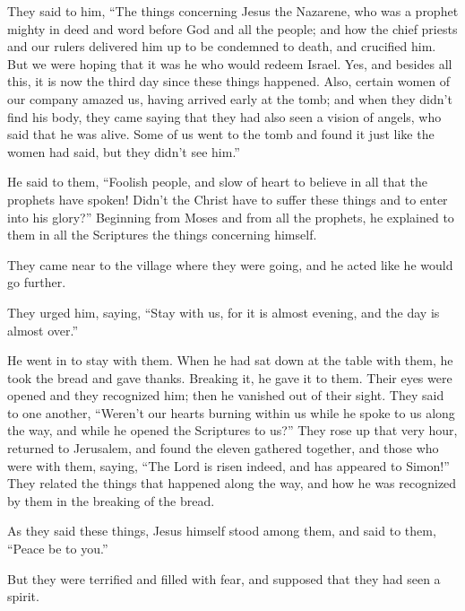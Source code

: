 They said to him, ``The things concerning Jesus the Nazarene, who was a
prophet mighty in deed and word before God and all the people;
 and how the chief priests and our rulers delivered him
up to be condemned to death, and crucified him.  But we
were hoping that it was he who would redeem Israel. Yes, and besides all
this, it is now the third day since these things happened.
 Also, certain women of our company amazed us, having
arrived early at the tomb;  and when they didn't find his
body, they came saying that they had also seen a vision of angels, who
said that he was alive.  Some of us went to the tomb and
found it just like the women had said, but they didn't see him.''

 He said to them, ``Foolish people, and slow of heart to
believe in all that the prophets have spoken!  Didn't the
Christ have to suffer these things and to enter into his glory?''
 Beginning from Moses and from all the prophets, he
explained to them in all the Scriptures the things concerning himself.

 They came near to the village where they were going, and
he acted like he would go further.

 They urged him, saying, ``Stay with us, for it is almost
evening, and the day is almost over.''

He went in to stay with them.  When he had sat down at
the table with them, he took the bread and gave thanks. Breaking it, he
gave it to them.  Their eyes were opened and they
recognized him; then he vanished out of their sight. 
They said to one another, ``Weren't our hearts burning within us while
he spoke to us along the way, and while he opened the Scriptures to
us?''  They rose up that very hour, returned to
Jerusalem, and found the eleven gathered together, and those who were
with them,  saying, ``The Lord is risen indeed, and has
appeared to Simon!''  They related the things that
happened along the way, and how he was recognized by them in the
breaking of the bread.

 As they said these things, Jesus himself stood among
them, and said to them, ``Peace be to you.''

 But they were terrified and filled with fear, and
supposed that they had seen a spirit.

